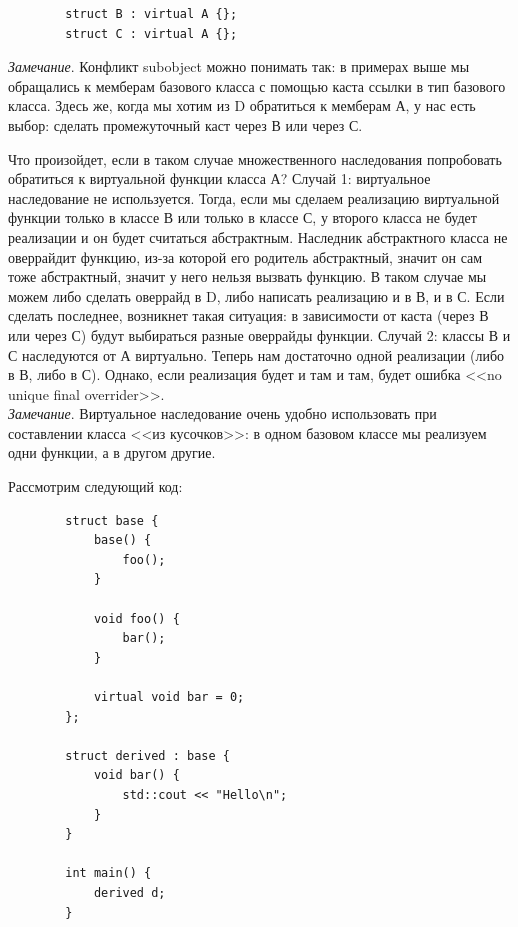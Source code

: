 \documentclass[12pt, a4paper]{article}
\begin{document}
	\begin{verbatim}
		struct B : virtual A {};
		struct C : virtual A {};
	\end{verbatim}
	\textit{Замечание}. Конфликт subobject можно понимать так: в примерах выше мы обращались к мемберам базового класса с помощью каста ссылки в тип базового класса. Здесь же, когда мы хотим из D обратиться к мемберам А, у нас есть выбор: сделать промежуточный каст через В или через С.
	\par Что произойдет, если в таком случае множественного наследования попробовать обратиться к виртуальной функции класса А? Случай 1: виртуальное наследование не используется. Тогда, если мы сделаем реализацию виртуальной функции только в классе В или только в классе С, у второго класса не будет реализации и он будет считаться абстрактным. Наследник абстрактного класса не оверрайдит функцию, из-за которой его родитель абстрактный, значит он сам тоже абстрактный, значит у него нельзя вызвать функцию. В таком случае мы можем либо сделать оверрайд в D, либо написать реализацию и в В, и в С. Если сделать последнее, возникнет такая ситуация: в зависимости от каста (через В или через С) будут выбираться разные оверрайды функции. Случай 2: классы В и С наследуются от А виртуально. Теперь нам достаточно одной реализации (либо в В, либо в С). Однако, если реализация будет и там и там, будет ошибка <<no unique final overrider>>.
	\\\textit{Замечание}. Виртуальное наследование очень удобно использовать при составлении класса <<из кусочков>>: в одном базовом классе мы реализуем одни функции, а в другом другие.
	\\\par Рассмотрим следующий код:
	\begin{verbatim}
		struct base {
			base() {
				foo();
			}
			
			void foo() {
				bar();
			}
			
			virtual void bar = 0;
		};
		
		struct derived : base {
			void bar() {
				std::cout << "Hello\n";
			}
		}
		
		int main() {
			derived d;
		}
	\end{verbatim}
\end{document}
